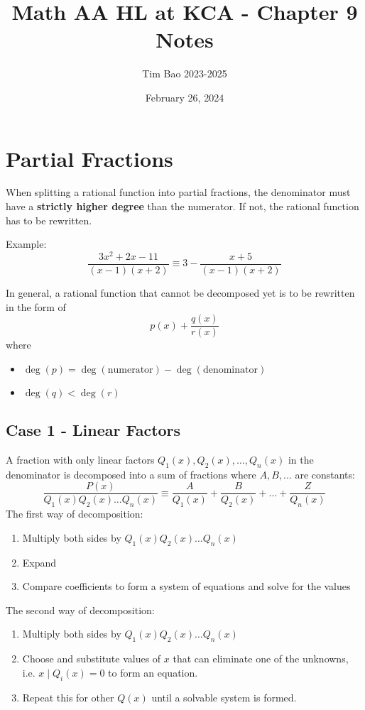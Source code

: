 \documentclass[11pt]{article}
\title{Math AA HL at KCA - Chapter 9 Notes}
\author{Tim Bao 2023-2025}
\date{February 26, 2024}
\begin{document}
\maketitle
\pagebreak
\tableofcontents
\pagebreak

\section{Partial Fractions}

When splitting a rational function into partial fractions, the denominator must have a \textbf{strictly higher degree} than the numerator. If not, the rational function has to be rewritten.

\noindent Example: $$\frac{3x^2 + 2x - 11}{(x-1)(x+2)} \equiv 3 - \frac{x+5}{(x - 1)(x + 2)}$$

\noindent In general, a rational function that cannot be decomposed yet is to be rewritten in the form of $$p(x) + \frac{q(x)}{r(x)}$$
where
\begin{itemize}
  \item $\deg(p) = \deg(\text{numerator}) - \deg(\text{denominator})$
  \item $\deg(q) < \deg(r)$
\end{itemize}

\subsection{Case 1 - Linear Factors}

A fraction with only linear factors $Q_1(x), Q_2(x), \dots, Q_n(x)$ in the denominator is decomposed into a sum of fractions where $A, B, ...$ are constants:
$$\frac{P(x)}{Q_1(x)Q_2(x)\dots Q_n(x)} \equiv \frac{A}{Q_1(x)} + \frac{B}{Q_2(x)} + \dots + \frac{Z}{Q_n(x)}$$
The first way of decomposition:
\begin{enumerate}
  \item Multiply both sides by $Q_1(x)Q_2(x)\dots Q_n(x)$
  \item Expand
  \item Compare coefficients to form a system of equations and solve for the values
\end{enumerate}
The second way of decomposition:
\begin{enumerate}
  \item Multiply both sides by $Q_1(x)Q_2(x)\dots Q_n(x)$
  \item Choose and substitute values of $x$ that can eliminate one of the unknowns, i.e. $x \mid Q_i(x) = 0$ to form an equation.
  \item Repeat this for other $Q(x)$ until a solvable system is formed.
\end{enumerate}
\end{document}
